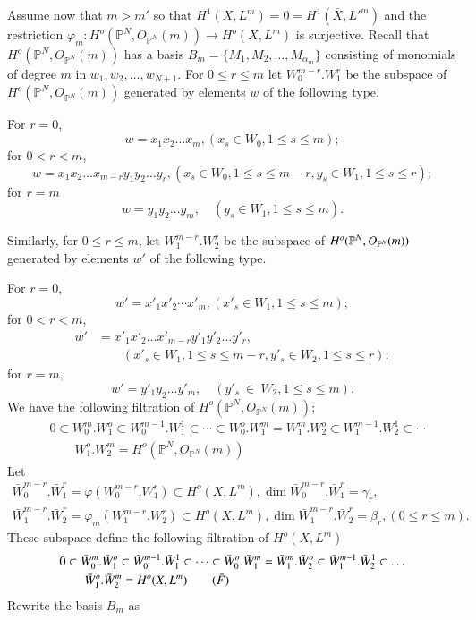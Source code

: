 {Assume now that $m > m'$ so that $H^{1}(X, L^{m}) = 0 = H^{1}
(\bar{X}, L'^{m})$ and the restriction $\varphi_{m} : H^o
(\mathbb{P}^{N}, O_{\mathbb{P}^{N}}(m)) \to H^o (X, L^{m})$ is
surjective. Recall that $H^o (\mathbb{P}^{N},
O_{\mathbb{P}^{N}}(m))$ has a basis $B_{m} = \{M_{1}, M_{2} , \ldots,
M_{\alpha_{m}}\}$ consisting of monomials of degree $m$ in $w_{1},
w_{2}, \ldots , w_{N+1}$. For $ 0 \leq r \leq m$ let
$W^{m-r}_{0}. W^{r}_{1}$ be the subspace of $H^o (\mathbb{P}^{N},
O_{\mathbb{P}^{N}}(m))$ generated by elements $w$ of the following
type.  

\noindent
For $r = 0$, 
$$
w = x_{1}x_{2} \dots x_{m}, (x_{s} \in W_{0} , 1 \le s \le m)
; 
$$
for $0 < r < m$,
$$
w = x_{1} x_{2} \dots x_{m-r} y_{1}y_{2} \dots y_{r},
(x_{s}\in W_{0}, 1 \le s \le m-r, y_{s} \in W_{1}, 1
\le s \le r); 
$$
for $r = m$
$$
w = y_{1}y_{2} \dots y_{m}, \quad (y_{s} \in W_{1} , 1 \le s \le
m). 
$$

Similarly, for $0 \leq r \leq m$, let $W^{m-r}_{1}. W^{r}_{2}$ be the
subspace of $H^o (\mathbb{P}^{N},\break O_{\mathbb{P}^{N}}(m))$ generated
by elements $w'$ of the following type. 

\noindent
For $r = 0$,
$$
w' = x'_{1}x'_{2} \cdots x'_{m} , (x'_{s} \in W_{1}, 1 \le s
\le m); 
$$
for $0 < r < m$,\pageoriginale 
\begin{align*}
w' & = x'_{1} x'_{2} \dots x'_{m-r} y'_{1} y'_{2} \dots y'_{r}, \\
& \qquad (x'_{s}
\in W_{1} , 1 \le s \le m-r , y'_{s} \in W_{2}, 1 \le
s \le r);  
\end{align*}
for $r = m$,
$$
w' = y'_{1}y_{2} \dots y'_{m}, \quad (y'_{s}~ \in ~W_{2} ,   1
\le s \le m). 
$$
We have the following filtration of $H^o (\mathbb{P}^{N},
O_{\mathbb{P}^{N}}(m))$;  
 \begin{align*}
&  0 \subset W^{m}_{0} . W^{o}_{1} \subset W^{m-1}_{0}. W^{1}_{1}
 \subset \cdots \subset W^{o}_{0}. W^{m}_{1} = W^{m}_{1}. W^{o}_{2}
 \subset W^{m-1}_{1}. W^{1}_{2} \subset  \cdots \\
& \qquad W^{o}_{1}. W^{m}_{2} =
 H^o (\mathbb{P}^{N}, O_{\mathbb{P}^{N}}(m)) \tag{F} 
\end{align*}
Let
{\fontsize{10}{12}\selectfont
\begin{gather*} 
\bar{W}^{m-r}_{0}. \bar{W}^{r}_1 = \varphi (W^{m-r}_{0}. W^{r}_{1})
\subset H^o (X , L^{m}),  \dim \bar{W}^{m-r}_{0}. \bar{W}^{r}_{1} =
\gamma_{r},  \\ 
\bar{W}^{m-r}_{1}. \bar{W}^{r}_2 = \varphi_m (W^{m-r}_{1}. W^{r}_{2})
\subset H^o (X , L^{m}),  \dim \bar{W}^{m-r}_{1}. \bar{W}^{r}_2 =
\beta _{r}, (0 \leq r \leq m). 
\end{gather*}}\relax
These subspace define the following filtration of $H^o (X, L^{m})$
\begin{align*}
& 0 \subset \bar{W}^{m}_{0} . \bar{W}^{o}_{1} \subset
\bar{W}^{m-1}_{0} . \bar{W}^{1}_{1} \subset \dots \subset
\bar{W}^{o}_{0}. \bar{W}^{m}_{1} = \bar{W}^{m}_{1}. \bar{W}^{o}_{2}
\subset \bar{W}^{m-1}_{1}. \bar{W}^{1}_{2} \subset  \dots\\
& \qquad \bar{W}^{o}_{1}. \bar{W}^{m}_{2}  = H^o (X, L^{m})
\tag{$\bar{F}$}  
\end{align*}
Rewrite the basis $B_{m}$ as

}
